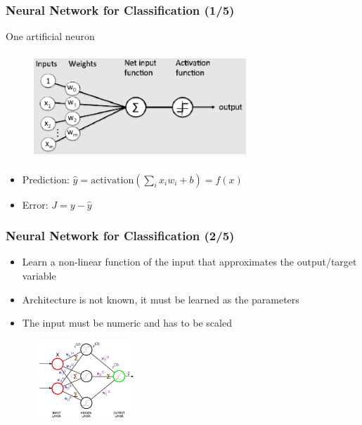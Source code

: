 \documentclass{beamer}
\begin{document}
\begin{frame}
\frametitle{Neural Network for Classification (1/5)}

One artificial neuron
\begin{figure}
  \includegraphics[width=8cm, height=4cm]{figures/OneNeuron.png}
\end{figure}

\begin{itemize}
\item Prediction: $\hat{y} = \textrm{activation}(\sum_i x_i w_i + b) = f(x)$
\item Error: $J = y - \hat{y} $
\end{itemize}

\end{frame}
\begin{frame}
\frametitle{Neural Network for Classification (2/5)}

\begin{itemize}
\item Learn a non-linear function of the input that approximates the output/target variable
\item Architecture is not known, it must be learned as the parameters
\item The input must be numeric and has to be scaled
\end{itemize}

\begin{figure}
  \includegraphics[width=4cm, height=3cm]{figures/NNArch.png}
\end{figure}

\end{frame}
\end{document}
